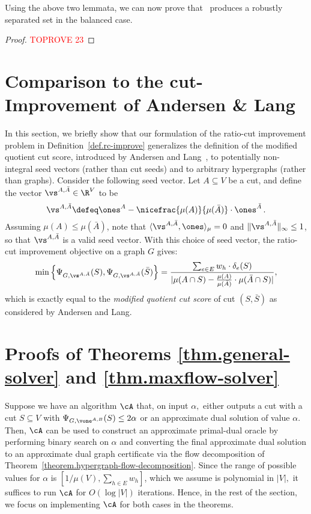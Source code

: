 \documentclass[letterpaper]{article}
\begin{document}
Using the above two lemmata, we can now prove that \roundcut~produces a robustly separated set in the balanced case.

\robustSeparatedBalanced*

\begin{proof}\textcolor{red}{TOPROVE 23}\end{proof}  \section{Comparison to the cut-Improvement of Andersen \& Lang}
\label{sec.appendix.andersen-lang}

In this section, we briefly show that our formulation of the ratio-cut improvement problem in Definition~\ref{def.rc-improve} generalizes  the definition of the modified quotient cut score, introduced by Andersen and Lang~\cite{Andersen-Lang}, to potentially non-integral seed vectors (rather than cut seeds) and to arbitrary hypergraphs (rather than graphs).
Consider the following seed vector. Let $A \subseteq V$ be a cut, and define the vector $\vs^{A,\bar{A}} \in \R^V$ to be
\begin{equation}
\label{def.seed-vector}
\vs^{A,\bar{A}} \defeq \ones^A - \nicefrac{\mu(A)}{\mu(\bar{A})} \cdot \ones^{\bar{A}} \, .
\end{equation}
Assuming $\mu(A) \leq \mu(\bar{A})$, note that $\langle \vs^{A,\bar{A}}, \ones \rangle_{\mu} = 0$ and $\lVert \vs^{A,\bar{A}} \rVert_{\infty} \leq 1$, so that $\vs^{A,\bar{A}}$ is a valid seed vector. With this choice of seed vector, the ratio-cut improvement objective on a graph $G$ gives:
\begin{equation*}
\min\left\{\Psi_{G, \vs^{A,\bar{A}}}(S), \Psi_{G, \vs^{A,\bar{A}}}(\bar{S})\right\}
= \frac{\sum_{e \in E} w_h \cdot \delta_e(S)}{\lvert \mu(A \cap S) - \frac{\mu(A)}{\mu(\bar{A})} \cdot \mu(\bar{A} \cap S) \rvert},
\end{equation*}
which is exactly equal to the \emph{modified quotient cut score} of cut $(S,\bar{S})$ as considered by Andersen and Lang.
 \section{Proofs of Theorems \ref{thm.general-solver} and \ref{thm.maxflow-solver}}
\label{sec.appendix.ci-algs}

Suppose we have an algorithm $\cA$ that,  on input $\alpha,$ either outputs a cut with a cut $S \subseteq V$ with $\Psi_{G,\vone^{A,B}}(S) \leq 2\alpha$ or an approximate dual solution of value $\alpha.$ Then, $\cA$ can be used to construct an approximate primal-dual oracle by performing binary search on $\alpha$ and converting the final approximate dual solution to an approximate dual graph certificate via the flow decomposition of Theorem~\ref{theorem.hypergraph-flow-decomposition}. Since the range of possible values for $\alpha$ is $[1/\mu(V),\sum_{h\in E} w_h]$, which we assume is polynomial in $|V|,$ it suffices to run $\cA$ for $O(\log |V|)$ iterations.
Hence, in the rest of the section, we focus on implementing $\cA$ for both cases in the theorems.
\end{document}
